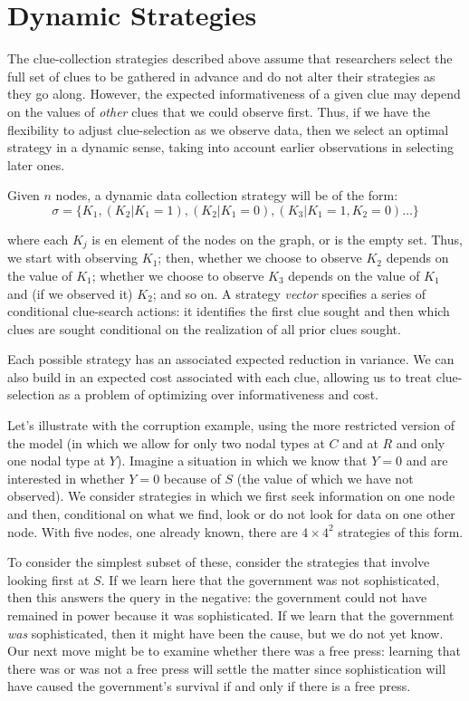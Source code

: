 \documentclass[
  12pt,
]{book}
\begin{document}
\hypertarget{dynamic-strategies}{%
\section{Dynamic Strategies}\label{dynamic-strategies}}

The clue-collection strategies described above assume that researchers select the full set of clues to be gathered in advance and do not alter their strategies as they go along. However, the expected informativeness of a given clue may depend on the values of \emph{other} clues that we could observe first. Thus, if we have the flexibility to adjust clue-selection as we observe data, then we select an optimal strategy in a dynamic sense, taking into account earlier observations in selecting later ones.

Given \(n\) nodes, a dynamic data collection strategy will be of the form:
\[\sigma = \{K_1, (K_2|K_1 = 1), (K_2|K_1 = 0), (K_3|K_1=1, K_2 =0)\dots\}\]

where each \(K_j\) is en element of the nodes on the graph, or is the empty set. Thus, we start with observing \(K_1\); then, whether we choose to observe \(K_2\) depends on the value of \(K_1\); whether we choose to observe \(K_3\) depends on the value of \(K_1\) and (if we observed it) \(K_2\); and so on. A strategy \emph{vector} specifies a series of conditional clue-search actions: it identifies the first clue sought and then which clues are sought conditional on the realization of all prior clues sought.

Each possible strategy has an associated expected reduction in variance. We can also build in an expected cost associated with each clue, allowing us to treat clue-selection as a problem of optimizing over informativeness and cost.

Let's illustrate with the corruption example, using the more restricted version of the model (in which we allow for only two nodal types at \(C\) and at \(R\) and only one nodal type at \(Y\)). Imagine a situation in which we know that \(Y=0\) and are interested in whether \(Y=0\) because of \(S\) (the value of which we have not observed). We consider strategies in which we first seek information on one node and then, conditional on what we find, look or do not look for data on one other node. With five nodes, one already known, there are \(4 \times 4^2\) strategies of this form.

To consider the simplest subset of these, consider the strategies that involve looking first at \(S\). If we learn here that the government was not sophisticated, then this answers the query in the negative: the government could not have remained in power because it was sophisticated. If we learn that the government \emph{was} sophisticated, then it might have been the cause, but we do not yet know. Our next move might be to examine whether there was a free press: learning that there was or was not a free press will settle the matter since sophistication will have caused the government's survival if and only if there is a free press.
\end{document}
